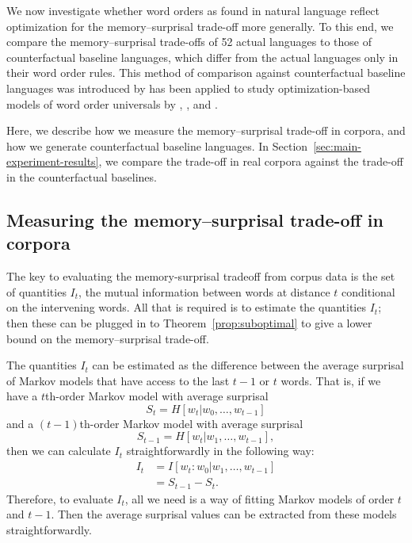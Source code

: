 We now investigate whether word orders as found in natural language reflect optimization for the memory--surprisal trade-off more generally.
To this end, we compare the memory--surprisal trade-offs of 52 actual languages to those of counterfactual baseline languages, which differ from the actual languages only in their word order rules. This method of comparison against counterfactual baseline languages was introduced by \citet{gildea-optimizing-2007,gildea-grammars-2010} has been applied to study optimization-based models of word order universals by \citet{futrell-large-scale-2015}, \citet{gildea-human-2015}, and \citet{hahn2020optimization}.

Here, we describe how we measure the memory--surprisal trade-off in corpora, and how we generate counterfactual baseline languages. In Section~\ref{sec:main-experiment-results}, we compare the trade-off in real corpora against the trade-off in the counterfactual baselines.

\subsection{Measuring the memory--surprisal trade-off in corpora}

The key to evaluating the memory-surprisal tradeoff from corpus data is the set of quantities $I_t$, the  mutual information between words at distance $t$ conditional on the intervening words. 
All that is required is to estimate the quantities $I_t$; then these can be plugged in to Theorem~\ref{prop:suboptimal} to give a lower bound on the memory--surprisal trade-off. 

The quantities $I_t$ can be estimated as the difference between the average surprisal of Markov models that have access to the last $t-1$ or $t$ words.
That is, if we have a $t$th-order Markov model with average surprisal
\begin{equation*}
    S_t = H[w_t | w_0, \dots, w_{t-1}]
\end{equation*}
and a $(t-1)$th-order Markov model with average surprisal
\begin{equation*}
    S_{t-1} = H[w_t | w_1, \dots, w_{t-1}],
\end{equation*}
then we can calculate $I_t$ straightforwardly in the following way:
\begin{align}
    \nonumber
    I_t &= I[w_t : w_0 | w_1, \dots, w_{t-1}] \\
    \nonumber
    &= S_{t-1} - S_t.
\end{align}
Therefore, to evaluate $I_t$, all we need is a way of fitting Markov models of order $t$ and $t-1$. Then the average surprisal values can be extracted from these models straightforwardly.

